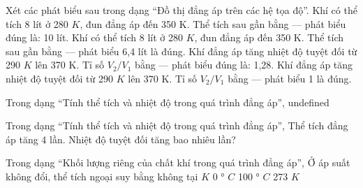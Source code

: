 \begin{ex}
Xét các phát biểu sau trong dạng “Đồ thị đẳng áp trên các hệ tọa độ”.
\choiceTF
{\True Khí có thể tích 8 lít ở 280 $K$, đun đẳng áp đến 350 K. Thể tích sau gần bằng — phát biểu đúng là: 10 lít.}
{Khí có thể tích 8 lít ở 280 $K$, đun đẳng áp đến 350 K. Thể tích sau gần bằng — phát biểu 6,4 lít là đúng.}
{\True Khí đẳng áp tăng nhiệt độ tuyệt đối từ 290 $K$ lên 370 K. Tỉ số $V_2/V_1$ bằng — phát biểu đúng là: 1,28.}
{Khí đẳng áp tăng nhiệt độ tuyệt đối từ 290 $K$ lên 370 K. Tỉ số $V_2/V_1$ bằng — phát biểu 1 là đúng.}
\end{ex}

\begin{bt}
Trong dạng “Tính thể tích và nhiệt độ trong quá trình đẳng áp”, undefined
\end{bt}

\begin{ex}
Trong dạng “Tính thể tích và nhiệt độ trong quá trình đẳng áp”, Thể tích đẳng áp tăng 4 lần. Nhiệt độ tuyệt đối tăng bao nhiêu lần?
\end{ex}

\begin{ex}
Trong dạng “Khối lượng riêng của chất khí trong quá trình đẳng áp”, Ở áp suất không đổi, thể tích ngoại suy bằng không tại
\choice
{ $K$}
{0 ° $C$}
{100 ° $C$}
{273 $K$}
\end{ex}

